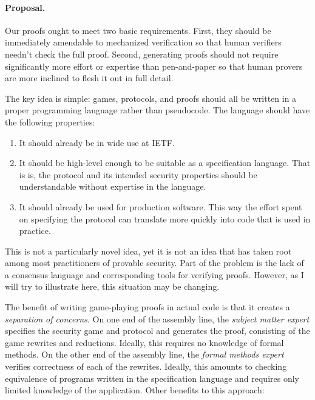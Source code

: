 \documentclass{article}
\begin{document}
%

\paragraph{Proposal.}
%
%
Our proofs ought to meet two basic requirements.
%
First, they should be immediately amendable to mechanized verification so that
human verifiers needn't check the full proof.
%
Second, generating proofs should not require significantly more effort or
expertise than pen-and-paper so that human provers are more inclined to flesh
it out in full detail.

The key idea is simple: games, protocols, and proofs should all be written in a
proper programming language rather than pseudocode. The language should have
the following properties:
%
\begin{enumerate}

  \item It should already be in wide use at IETF.

  \item It should be high-level enough to be suitable as a specification
    language. That is is, the protocol and its intended security properties
    should be understandable without expertise in the language.

  \item It should already be used for production software. This way the effort
    spent on specifying the protocol can translate more quickly into code that is
    used in practice.

\end{enumerate}
%
This is not a particularly novel idea, yet it is not an idea that has taken
root among most practitioners of provable security.
%
Part of the problem is the lack of a consensus language and corresponding tools
for verifying proofs. However, as I will try to illustrate here, this situation
may be changing.

The benefit of writing game-playing proofs in actual code is that it creates a
\emph{separation of concerns}.
%
On one end of the assembly line, the \emph{subject matter expert} specifies the
security game and protocol and generates the proof, consisting of the game
rewrites and reductions. Ideally, this requires no knowledge of formal methods.
%
On the other end of the assembly line, the \emph{formal methods expert}
verifies correctness of each of the rewrites. Ideally, this amounts to checking
equivalence of programs written in the specification language and requires only
limited knowledge of the application.
%
Other benefits to this approach:
\end{document}
